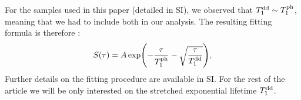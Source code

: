\documentclass[preprintnumbers,amsmath,amssymb,superscriptaddress,twocolumn,showpacs]{revtex4-2}
\begin{document}
For the samples used in this paper (detailed in SI), we observed that $T_1^{\rm dd} \sim T_1^{\rm ph}$, meaning that we had to include both  in our analysis. The resulting fitting formula is therefore :
\begin{equation}
S(\tau)=A \exp (-\frac{\tau}{T_1^{\rm ph}} -\sqrt{\frac{\tau}{T_1^{\rm dd}}}),
\end{equation}
Further details on the fitting procedure are available in SI. For the rest of the article we will be only interested on the stretched exponential lifetime ${T_1^{\rm dd}}$.


%
\end{document}
